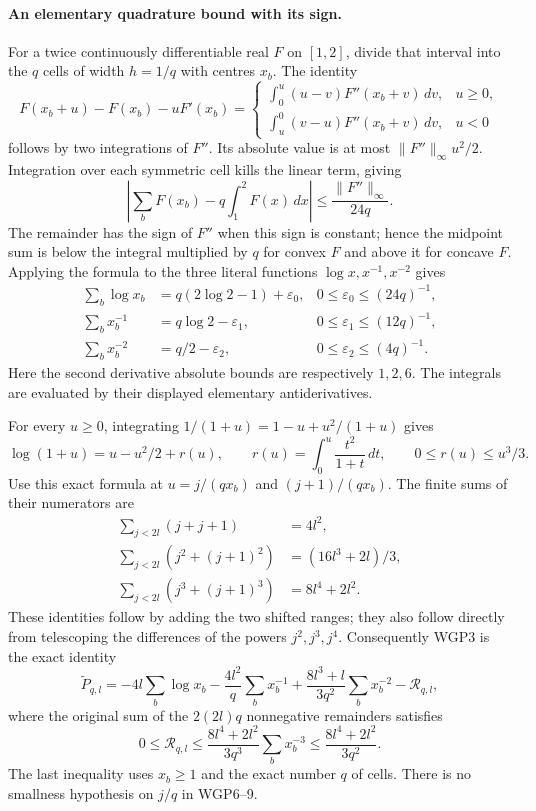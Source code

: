 \documentclass[11pt,a4paper]{article}
\begin{document}
\paragraph{An elementary quadrature bound with its sign.}
For a twice continuously differentiable real $F$ on $[1,2]$, divide
that interval into the $q$ cells of width $h=1/q$ with centres $x_b$.
The identity
\[
 F(x_b+u)-F(x_b)-uF'(x_b)
 =\begin{cases}
 \displaystyle\int_0^u(u-v)F''(x_b+v)\,dv,&u\ge0,\\
 \displaystyle\int_u^0(v-u)F''(x_b+v)\,dv,&u<0
 \end{cases}
\]
follows by two integrations of $F''$. Its absolute value is at most
$\|F''\|_\infty u^2/2$. Integration over each symmetric cell kills the
linear term, giving
\[
 \left|\sum_b F(x_b)-q\int_1^2F(x)\,dx\right|
 \le\frac{\|F''\|_\infty}{24q}.
 \tag{WGP4}
\]
The remainder has the sign of $F''$ when this sign is constant; hence
the midpoint sum is below the integral multiplied by $q$ for convex $F$
and above it for concave $F$. Applying the formula to the three literal
functions $\log x,x^{-1},x^{-2}$ gives
\[
 \begin{aligned}
 \sum_b\log x_b&=q(2\log2-1)+\varepsilon_0,
       &0\le\varepsilon_0\le(24q)^{-1},\\
 \sum_b x_b^{-1}&=q\log2-\varepsilon_1,
       &0\le\varepsilon_1\le(12q)^{-1},\\
 \sum_b x_b^{-2}&=q/2-\varepsilon_2,
       &0\le\varepsilon_2\le(4q)^{-1}.
 \end{aligned}\tag{WGP5}
\]
Here the second derivative absolute bounds are respectively $1,2,6$.
The integrals are evaluated by their displayed elementary antiderivatives.

For every $u\ge0$, integrating
$1/(1+u)=1-u+u^2/(1+u)$ gives
\[
 \log(1+u)=u-u^2/2+r(u),\qquad
 r(u)=\int_0^u\frac{t^2}{1+t}\,dt,\qquad 0\le r(u)\le u^3/3.
 \tag{WGP6}
\]
Use this exact formula at $u=j/(qx_b)$ and $(j+1)/(qx_b)$.
The finite sums of their numerators are
\[
 \begin{aligned}
 \sum_{j<2l}(j+j+1)&=4l^2,\\
 \sum_{j<2l}(j^2+(j+1)^2)&=(16l^3+2l)/3,\\
 \sum_{j<2l}(j^3+(j+1)^3)&=8l^4+2l^2.
 \end{aligned}\tag{WGP7}
\]
These identities follow by adding the two shifted ranges; they also follow
directly from telescoping the differences of the powers $j^2,j^3,j^4$.
Consequently WGP3 is the exact identity
\[
 \widetilde P_{q,l}
 =-4l\sum_b\log x_b-\frac{4l^2}{q}\sum_bx_b^{-1}
   +\frac{8l^3+l}{3q^2}\sum_bx_b^{-2}-\mathcal R_{q,l},
 \tag{WGP8}
\]
where the original sum of the $2(2l)q$ nonnegative remainders satisfies
\[
 0\le\mathcal R_{q,l}
 \le\frac{8l^4+2l^2}{3q^3}\sum_bx_b^{-3}
 \le\frac{8l^4+2l^2}{3q^2}.
 \tag{WGP9}
\]
The last inequality uses $x_b\ge1$ and the exact number $q$ of cells.
There is no smallness hypothesis on $j/q$ in WGP6--9.
\end{document}
